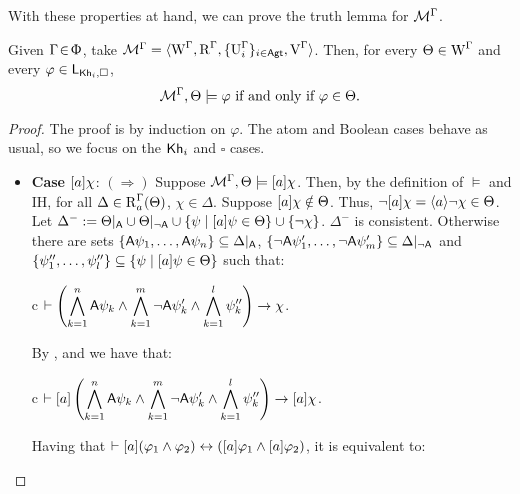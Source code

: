 With these properties at hand, we can prove the truth lemma for $\mathcal{M}^\Gamma$.

\medskip

\begin{lemma}\label{tlm:cm-ults-lkhi}
Given $\Gamma \!\in\! \Upphi$, take $\mathcal{M}^\Gamma = \langle \operatorname{W}^\Gamma, \operatorname{R}^\Gamma, \{ \operatorname{U}^\Gamma_i \}_{i \in {\rm \sf Agt}}, \operatorname{V}^\Gamma \rangle$. Then, for every $\Theta \in \operatorname{W}^\Gamma$ and every $\varphi \in \mathsf{L}_{{\sf Kh}_i,\square}$,  %
\[
\mathcal{M}^\Gamma, \Theta \models \varphi \mbox{ if and only if } \varphi \in \Theta.
\]
\end{lemma}
\begin{proof}
The proof is by induction on $\varphi$.
The atom and Boolean cases behave as usual, so we focus on the ${\sf Kh}_i$ and $\square$ cases.

\begin{itemize}
\item \textbf{Case $[a]\chi$}: $(\Rightarrow)$ Suppose $\mathcal{M}^\Gamma,\Theta \models [a]\chi$. Then, by the definition of $\models$ and IH, for all $\Delta \in \operatorname{R}^\Gamma_a(\Theta)$, $\chi \in \Delta$.
Suppose $[a]\chi \notin \Theta$. Thus, $\neg[a]\chi = \langle a \rangle\neg\chi \in \Theta$.
Let $\Delta^- := \Theta\vert_{{\sf A}} \cup \Theta\vert_{\lnot{\sf A}} \cup \{ \psi \mid [a]\psi \in \Theta \} \cup \{ \neg\chi \}$. $\Delta^-$ is consistent.
Otherwise there are sets $\{ {\sf A}\psi_1, \ldots, {\sf A}\psi_n \} \subseteq \Delta\vert_{{\sf A}}$, $\{ \lnot {\sf A}\psi'_1, \ldots, \lnot {\sf A}\psi'_m \} \subseteq \Delta\vert_{\lnot{\sf A}}$ and $\{ \psi''_1, \ldots, \psi''_l \} \subseteq \{ \psi \mid [a]\psi \in \Theta \}$ such that:

\begin{ctabular}{c}
$\vdash
\displaystyle
\left( \bigwedge_{k=1}^{n} {\sf A}\psi_k \land \bigwedge_{k=1}^{m} \lnot {\sf A}\psi'_k \land \bigwedge_{k=1}^{l} \psi''_k \right)
\rightarrow \chi$.
\end{ctabular}

By ,  and  we have that:

\begin{ctabular}{c}
$\vdash
\displaystyle
[a] \left( \bigwedge_{k=1}^{n} {\sf A}\psi_k \land \bigwedge_{k=1}^{m} \lnot {\sf A}\psi'_k \land \bigwedge_{k=1}^{l} \psi''_k \right)
\rightarrow [a] \chi$.
\end{ctabular}

Having that $\vdash [a](\varphi_1 \wedge \varphi_2) \leftrightarrow ([a] \varphi_1 \wedge [a] \varphi_2)$, it is equivalent to:


\end{itemize}
\end{proof}
